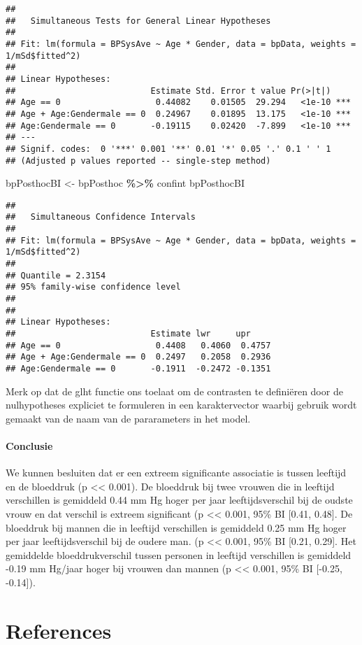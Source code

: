 \documentclass[
  12pt,dutch,coursenotes]{book}
\newenvironment{Shaded}{\begin{snugshade}}{\end{snugshade}}
\newcommand{\NormalTok}[1]{#1}
\newcommand{\OperatorTok}[1]{\textcolor[rgb]{0.81,0.36,0.00}{\textbf{#1}}}
\newcommand{\StringTok}[1]{\textcolor[rgb]{0.31,0.60,0.02}{#1}}
\theoremstyle{definition}
\theoremstyle{definition}
\theoremstyle{definition}
\theoremstyle{remark}
\begin{document}
\begin{verbatim}
## 
##   Simultaneous Tests for General Linear Hypotheses
## 
## Fit: lm(formula = BPSysAve ~ Age * Gender, data = bpData, weights = 1/mSd$fitted^2)
## 
## Linear Hypotheses:
##                           Estimate Std. Error t value Pr(>|t|)    
## Age == 0                   0.44082    0.01505  29.294   <1e-10 ***
## Age + Age:Gendermale == 0  0.24967    0.01895  13.175   <1e-10 ***
## Age:Gendermale == 0       -0.19115    0.02420  -7.899   <1e-10 ***
## ---
## Signif. codes:  0 '***' 0.001 '**' 0.01 '*' 0.05 '.' 0.1 ' ' 1
## (Adjusted p values reported -- single-step method)
\end{verbatim}

\begin{Shaded}
\begin{Highlighting}[]
\NormalTok{bpPosthocBI \textless{}{-}}\StringTok{ }\NormalTok{bpPosthoc }\OperatorTok{\%\textgreater{}\%}\StringTok{ }\NormalTok{confint}
\NormalTok{bpPosthocBI}
\end{Highlighting}
\end{Shaded}

\begin{verbatim}
## 
##   Simultaneous Confidence Intervals
## 
## Fit: lm(formula = BPSysAve ~ Age * Gender, data = bpData, weights = 1/mSd$fitted^2)
## 
## Quantile = 2.3154
## 95% family-wise confidence level
##  
## 
## Linear Hypotheses:
##                           Estimate lwr     upr    
## Age == 0                   0.4408   0.4060  0.4757
## Age + Age:Gendermale == 0  0.2497   0.2058  0.2936
## Age:Gendermale == 0       -0.1911  -0.2472 -0.1351
\end{verbatim}

Merk op dat de glht functie ons toelaat om de contrasten te definiëren door de nulhypotheses expliciet te formuleren in een karaktervector waarbij gebruik wordt gemaakt van de naam van de pararameters in het model.

\hypertarget{conclusie-2}{%
\subsubsection{Conclusie}\label{conclusie-2}}

We kunnen besluiten dat er een extreem significante associatie is tussen leeftijd en de bloeddruk (p \textless\textless{} 0.001).
De bloeddruk bij twee vrouwen die in leeftijd verschillen is gemiddeld 0.44 mm Hg hoger per jaar leeftijdsverschil bij de oudste vrouw en dat verschil is extreem significant (p \textless\textless{} 0.001, 95\% BI {[}0.41, 0.48{]}.
De bloeddruk bij mannen die in leeftijd verschillen is gemiddeld 0.25 mm Hg hoger per jaar leeftijdsverschil bij de oudere man. (p \textless\textless{} 0.001, 95\% BI {[}0.21, 0.29{]}.
Het gemiddelde bloeddrukverschil tussen personen in leeftijd verschillen is gemiddeld -0.19 mm Hg/jaar hoger bij vrouwen dan mannen (p \textless\textless{} 0.001, 95\% BI {[}-0.25, -0.14{]}).

\hypertarget{references}{%
\chapter{References}\label{references}}

  
\end{document}
